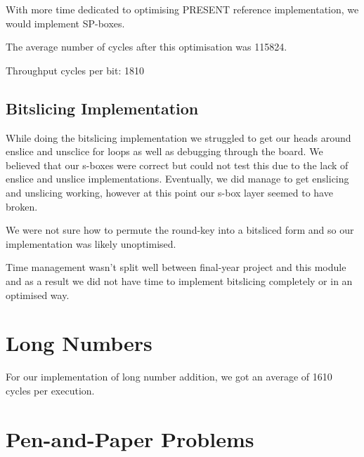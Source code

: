 \documentclass[11pt, a4paper]{article}
\begin{document}
With more time dedicated to optimising PRESENT reference implementation, we would implement SP-boxes.

The average number of cycles after this optimisation was 115824.

Throughput cycles per bit: 1810

\subsection{Bitslicing Implementation}\label{subsec:bitslicingImplementation}
While doing the bitslicing implementation we struggled to get our heads around enslice and unsclice for loops as well as debugging through the board. We believed that our s-boxes were correct but could not test this due to the lack of enslice and unslice implementations. Eventually, we did manage to get enslicing and unslicing working, however at this point our s-box layer seemed to have broken.

We were not sure how to permute the round-key into a bitsliced form and so our implementation was likely unoptimised.

Time management wasn't split well between final-year project and this module and as a result we did not have time to implement bitslicing completely or in an optimised way.






\section{Long Numbers}\label{sec:longnumbers}
For our implementation of long number addition, we got an average of 1610 cycles per execution.

\section{Pen-and-Paper Problems}\label{sec:penandpaperproblems}
\end{document}
